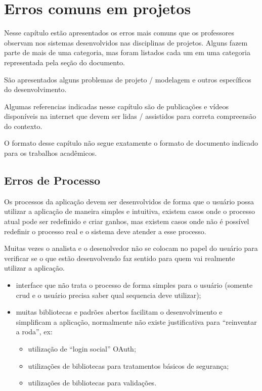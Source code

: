 \newcommand{\video}[2]{\href{#1}{Vídeo: #2}}


\chapter{Erros comuns em projetos}
\label{erros-projetos}

Nesse capítulo estão apresentados os erros mais comuns que os professores observam nos sistemas desenvolvidos nas disciplinas de projetos. Alguns fazem parte de mais de uma categoria, mas foram listados cada um em uma categoria representada pela seção do documento.

São apresentados alguns problemas de projeto / modelagem e outros específicos do desenvolvimento.

Algumas referencias indicadas nesse capítulo são de publicações e vídeos disponíveis na internet que devem ser lidas / assistidos para correta compreensão do contexto.

O formato desse capítulo não segue exatamente o formato de documento indicado para os trabalhos acadêmicos.



\section{Erros de Processo}

Os processos da aplicação devem ser desenvolvidos de forma que o usuário possa utilizar a aplicação de maneira simples e intuitiva, existem casos onde o processo atual pode ser redefinido e criar ganhos, mas existem casos onde não é possível redefinir o processo real e o sistema deve atender a esse processo.

Muitas vezes o analista e o desenolvedor não se colocam no papel do usuário para verificar se o que estão desenvolvendo faz sentido para quem vai realmente utilizar a aplicação.

\begin{itemize}
    \item interface que não trata o processo de forma simples para o usuário (somente \gls{crud} e o usuário precisa saber qual sequencia deve utilizar);
    
    \item muitas bibliotecas e padrões abertos facilitam o desenvolvimento e simplificam a aplicação, normalmente não existe justificativa para \enquote{reinventar a roda}, ex: 
      \begin{itemize}
          \item utilização de \enquote{login social} OAuth;

          \item utilizações de bibliotecas para tratamentos básicos de segurança;
          
          \item utilizações de bibliotecas para validações.
      \end{itemize}
\end{itemize}

